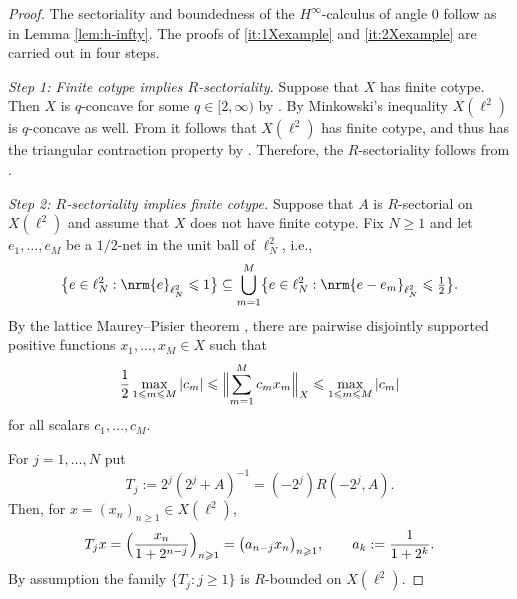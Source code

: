 \documentclass{amsart}
\let\le\leqslant
\let\leq\leqslant
\let\ge\geqslant
\let\geq\geqslant
\theoremstyle{plain}
\theoremstyle{remark}
\theoremstyle{plain}
\numberwithin{equation}{section}
\newcommand{\1}{\mathbf 1}
\DeclarePairedDelimiter{\nrm}\lVert\rVert
\newcommand{\cbraceb}[1]{\bigl\{#1\bigr\}}
\newcommand{\nrmB}[1]{\Bigl\|#1\Bigr\|}
\begin{document}
\begin{proof}
The sectoriality and boundedness of the $H^\infty$-calculus of angle $0$ follow as in Lemma \ref{lem:h-infty}.
The proofs of \ref{it:1Xexample} and \ref{it:2Xexample} are carried out in four steps.

\smallskip
{\em Step 1: Finite cotype implies $R$-sectoriality.} 
Suppose that $X$ has finite cotype. Then $X$ is $q$-concave for some $q\in [2, \infty)$ by \cite[Corollary 1.f.9]{LT79}. By Minkowski's inequality $X(\ell^2)$ is $q$-concave as well. From \cite[Proposition 1.f.3]{LT79} it follows that $X(\ell^2)$ has finite cotype, and thus has the triangular contraction property by \cite[Theorem 7.5.20]{HNVW2}. Therefore, the $R$-sectoriality follows from \cite[Theorem 10.3.4(2)]{HNVW2}.

\smallskip
{\em Step 2: $R$-sectoriality implies finite cotype.}
Suppose that $A$ is $R$-sectorial on $X(\ell^2)$ and assume that $X$ does not have finite cotype. Fix $N\geq 1$ and let $e_1,\ldots,e_M$ be a $1/2$-net in the unit ball of $\ell_N^2$, i.e.,
$$
\cbraceb{e \in \ell^2_N:\nrm{e}_{\ell^2_N} \leq 1} \subseteq \bigcup_{m=1}^M \cbraceb{e \in \ell^2_N:\nrm{e-e_m}_{\ell^2_N} \leq \tfrac12}.
$$
By the lattice Maurey--Pisier theorem \cite[Theorem 1.f.12]{LT79}, there are pairwise
disjointly supported positive functions $x_1,\ldots,x_M\in X$ such that
\begin{equation}\label{eq:MP}
        \frac12\max_{1\le m\le M}|c_m| \le \nrmB{\sum_{m=1}^M c_mx_m}_X\le \max_{1\le m\le M}|c_m|
\end{equation}
for all scalars $c_1,\ldots,c_M$.


For $j=1,\ldots,N$ put
\[
        T_j:=2^j(2^j+A)^{-1}=(-2^j)R(-2^j,A).
\]
Then, for $x=(x_n)_{n\ge1}\in X(\ell^2)$,
\[
        T_jx = \Bigl(\frac{x_n}{1+2^{n-j}}\Bigr)_{n\ge1} =\bigl(a_{n-j}x_n\bigr)_{n\ge1},    \qquad    a_k:=\frac{1}{1+2^k}.
\]
By assumption the family $\{T_j:j\ge1\}$ is $R$-bounded on
$X(\ell^2)$.


\end{proof}
\end{document}
